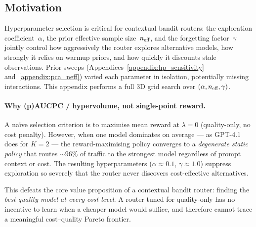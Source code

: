 
\subsection{Motivation}
\label{appendix:alpha_neff_motivation}

Hyperparameter selection is critical for contextual bandit routers: the
exploration coefficient~$\alpha$, the prior effective sample
size~$n_{\text{eff}}$, and the forgetting factor~$\gamma$ jointly control how
aggressively the router explores alternative models, how strongly it
relies on warmup priors, and how quickly it discounts stale observations.
Prior sweeps (Appendices~\ref{appendix:hp_sensitivity}
and~\ref{appendix:pca_neff}) varied each parameter in isolation,
potentially missing interactions.  This appendix performs a full 3D grid
search over $(\alpha, n_{\text{eff}}, \gamma)$.

\paragraph{Why (p)AUCPC / hypervolume, not single-point reward.}
\label{appendix:alpha_neff_objective}
A na\"ive selection criterion is to maximise mean reward at
$\lambda{=}0$ (quality-only, no cost penalty).  However, when one model
dominates on average --- as GPT-4.1 does for $K{=}2$ --- the
reward-maximising policy converges to a \emph{degenerate static policy}
that routes ${\sim}96\%$ of traffic to the strongest model regardless of
prompt context or cost.  The resulting hyperparameters
($\alpha{\approx}0.1$, $\gamma{\approx}1.0$) suppress exploration so
severely that the router never discovers cost-effective alternatives.

This defeats the core value proposition of a contextual bandit router:
finding the \emph{best quality model at every cost level}.  A router
tuned for quality-only has no incentive to learn when a cheaper model
would suffice, and therefore cannot trace a meaningful cost--quality
Pareto frontier.

